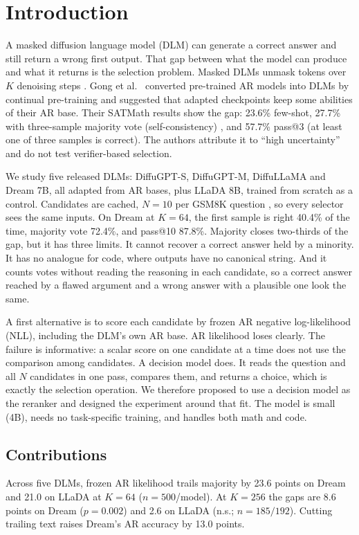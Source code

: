 \section{Introduction}
\label{sec:introduction}

A masked diffusion language model (DLM) can generate a correct answer and still return a wrong first output. That gap between what the model can produce and what it returns is the selection problem. Masked DLMs unmask tokens over $K$ denoising steps \cite{sahoo2024mdlm,nie2025llada}. Gong et al.~\cite{gong2025diffullama} converted pre-trained AR models into DLMs by continual pre-training and suggested that adapted checkpoints keep some abilities of their AR base. Their SATMath results show the gap: 23.6\% few-shot, 27.7\% with three-sample majority vote (self-consistency) \cite{wang2023selfconsistency}, and 57.7\% pass@3 (at least one of three samples is correct). The authors attribute it to ``high uncertainty'' and do not test verifier-based selection.

We study five released DLMs: DiffuGPT-S, DiffuGPT-M, DiffuLLaMA and Dream 7B, all adapted from AR bases, plus LLaDA 8B, trained from scratch as a control. Candidates are cached, $N=10$ per GSM8K question \cite{cobbe2021gsm8k}, so every selector sees the same inputs. On Dream at $K=64$, the first sample is right 40.4\% of the time, majority vote 72.4\%, and pass@10 87.8\%. Majority closes two-thirds of the gap, but it has three limits. It cannot recover a correct answer held by a minority. It has no analogue for code, where outputs have no canonical string. And it counts votes without reading the reasoning in each candidate, so a correct answer reached by a flawed argument and a wrong answer with a plausible one look the same.

A first alternative is to score each candidate by frozen AR negative log-likelihood (NLL), including the DLM's own AR base. AR likelihood loses clearly. The failure is informative: a scalar score on one candidate at a time does not use the comparison among candidates. A decision model does. It reads the question and all $N$ candidates in one pass, compares them, and returns a choice, which is exactly the selection operation. We therefore proposed to use a decision model as the reranker and designed the experiment around that fit. The model is small (4B), needs no task-specific training, and handles both math and code.

\subsection{Contributions}
Across five DLMs, frozen AR likelihood trails majority by 23.6 points on Dream and 21.0 on LLaDA at $K=64$ ($n=500$/model). At $K=256$ the gaps are 8.6 points on Dream ($p=0.002$) and 2.6 on LLaDA (n.s.; $n=185/192$). Cutting trailing text raises Dream's AR accuracy by 13.0 points.

